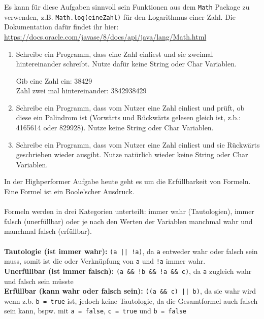 \documentclass{../../sheet}
\begin{document}
Es kann für diese Aufgaben sinnvoll sein Funktionen aus dem \texttt{Math} Package zu verwenden, z.B. \texttt{Math.log(eineZahl)} für den Logarithmus einer Zahl. Die Dokumentation dafür findet ihr hier: \url{https://docs.oracle.com/javase/8/docs/api/java/lang/Math.html}
\begin{enumerate}
    \item Schreibe ein Programm, dass eine Zahl einliest und sie zweimal hintereinander schreibt. Nutze dafür keine String oder Char Variablen.
    \begin{ausgabe}
Gib eine Zahl ein: 38429\\
Zahl zwei mal hintereinander: 3842938429
    \end{ausgabe}
    \item Schreibe ein Programm, dass vom Nutzer eine Zahl einliest und prüft, ob diese ein Palindrom ist (Vorwärts und Rückwärts gelesen gleich ist, z.b.: 4165614 oder 829928). Nutze keine String oder Char Variablen.
    \item Schreibe ein Programm, dass vom Nutzer eine Zahl einliest und sie Rückwärts geschrieben wieder ausgibt. Nutze natürlich wieder keine String oder Char Variablen.
\end{enumerate}

\newpage
{}
In der Highperformer Aufgabe heute geht es um die Erfüllbarkeit von Formeln. Eine Formel ist ein Boole'scher Ausdruck.
\\\\
Formeln werden in drei Kategorien unterteilt: immer wahr (Tautologien), immer falsch (unerfüllbar) oder je nach den Werten der Variablen manchmal wahr und manchmal falsch (erfüllbar).
\\\\
\textbf{Tautologie (ist immer wahr): } \texttt{(a || !a)}, da \texttt{a} entweder wahr oder falsch sein muss, somit ist die oder Verknüpfung von \texttt{a} und \texttt{!a} immer wahr.\\
\textbf{Unerfüllbar (ist immer falsch): } \texttt{(a \&\& !b \&\& !a \&\& c)}, da \texttt{a} zugleich wahr und falsch sein müsste\\
\textbf{Erfüllbar (kann wahr oder falsch sein): } \texttt{((a \&\& c) || b)}, da sie wahr wird wenn z.b. \texttt{b = true} ist, jedoch keine Tautologie, da die Gesamtformel auch falsch sein kann, bspw. mit \texttt{a = false}, \texttt{c = true} und \texttt{b = false}
\end{document}
